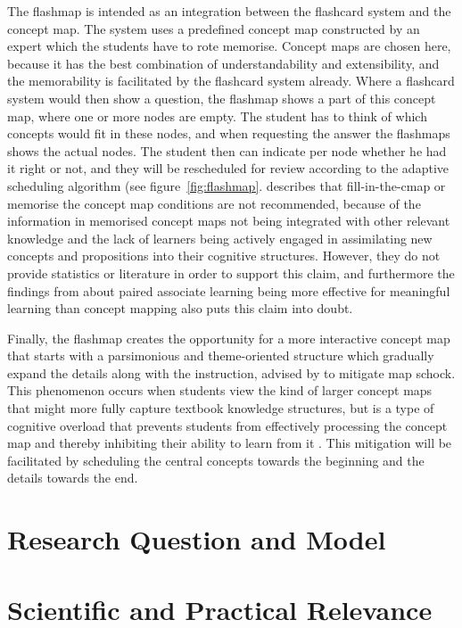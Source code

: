 The flashmap is intended as an integration between the flashcard system and the concept map. The system uses a predefined concept map constructed by an expert which the students have to rote memorise. Concept maps are chosen here, because it has the best combination of understandability and extensibility, and the memorability is facilitated by the flashcard system already. Where a flashcard system would then show a question, the flashmap shows a part of this concept map, where one or more nodes are empty. The student has to think of which concepts would fit in these nodes, and when requesting the answer the flashmaps shows the actual nodes. The student then can indicate per node whether he had it right or not, and they will be rescheduled for review according to the adaptive scheduling algorithm (see figure~\ref{fig:flashmap}.  describes that fill-in-the-cmap or memorise the concept map conditions are not recommended, because of the information in memorised concept maps not being integrated with other relevant knowledge and the lack of learners being actively engaged in assimilating new concepts and propositions into their cognitive structures. However, they do not provide statistics or literature in order to support this claim, and furthermore the findings from  about paired associate learning being more effective for meaningful learning than concept mapping also puts this claim into doubt.

Finally, the flashmap creates the opportunity for a more interactive concept map that starts with a parsimonious and theme-oriented structure which gradually expand the details along with the instruction, advised by  to mitigate map schock. This phenomenon occurs when students view the kind of larger concept maps that might more fully capture textbook knowledge structures, but is a type of cognitive overload that prevents students from effectively processing the concept map and thereby inhibiting their ability to learn from it \cite{moore}. This mitigation will be facilitated by scheduling the central concepts towards the beginning and the details towards the end.

\section{Research Question and Model}


\section{Scientific and Practical Relevance}


